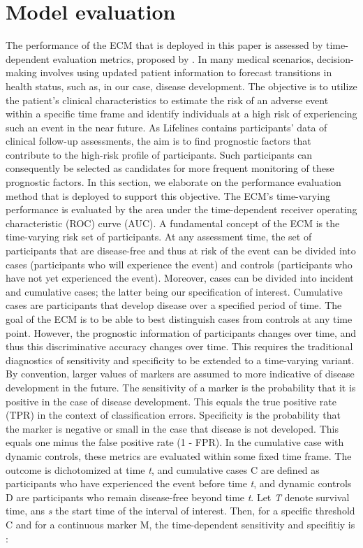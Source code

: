 \section{Model evaluation}
\label{section:methodology:model_evaluation}
The performance of the ECM that is deployed in this paper is assessed by time-dependent evaluation metrics, proposed by \cite{bansal2018tutorial}. In many medical scenarios, decision-making involves using updated patient information to forecast transitions in health status, such as, in our case, disease development. The objective is to utilize the patient's clinical characteristics to estimate the risk of an adverse event within a specific time frame and identify individuals at a high risk of experiencing such an event in the near future. As Lifelines contains participants' data of clinical follow-up assessments, the aim is to find prognostic factors that contribute to the high-risk profile of participants. Such participants can consequently be selected as candidates for more frequent monitoring of these prognostic factors. In this section, we elaborate on the performance evaluation method that is deployed to support this objective. 
The ECM's time-varying performance is evaluated by the area under the time-dependent receiver operating characteristic (ROC) curve (AUC). A fundamental concept of the ECM is the time-varying risk set of participants. At any assessment time, the set of participants that are disease-free and thus at risk of the event can be divided into cases (participants who will experience the event) and controls (participants who have not yet experienced the event). Moreover, cases can be divided into incident and cumulative cases; the latter being our specification of interest. Cumulative cases are participants that develop disease over a specified period of time. The goal of the ECM is to be able to best distinguish cases from controls at any time point. However, the prognostic information of participants changes over time, and thus this discriminative accuracy changes over time. This requires the traditional diagnostics of sensitivity and specificity to be extended to a time-varying variant. By convention, larger values of markers are assumed to more indicative of disease development in the future. The sensitivity of a marker is the probability that it is positive in the case of disease development. This equals the true positive rate (TPR) in the context of classification errors. Specificity is the probability that the marker is negative or small in the case that disease is not developed. This equals one minus the false positive rate (1 - FPR). In the cumulative case with dynamic controls, these metrics are evaluated within some fixed time frame. The outcome is dichotomized at time \textit{t}, and cumulative cases C are defined as participants who have experienced the event before time \textit{t}, and dynamic controls D are participants who remain disease-free beyond time \textit{t}. Let \textit{T} denote survival time, ans \textit{s} the start time of the interval of interest. Then, for a specific threshold C and for a continuous marker M, the time-dependent sensitivity and specifitiy is : 

